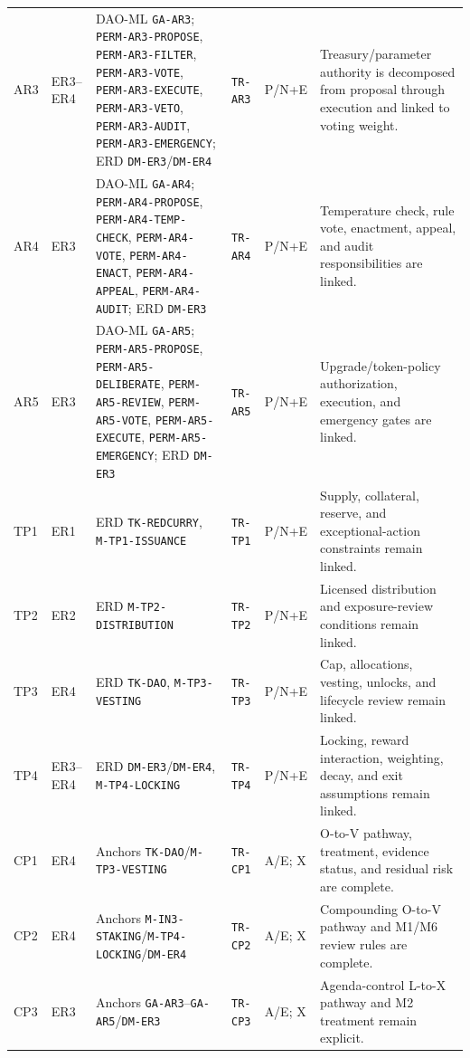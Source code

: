 \documentclass[10pt]{article}
\begin{document}
\begin{landscape}
{\begin{longtable}{@{}p{.035\linewidth}p{.07\linewidth}p{.245\linewidth}p{.105\linewidth}p{.09\linewidth}p{.31\linewidth}@{}}
AR3 & ER3--ER4 & DAO-ML \texttt{GA-AR3}; \texttt{PERM-AR3-PROPOSE}, \texttt{PERM-AR3-FILTER}, \texttt{PERM-AR3-VOTE}, \texttt{PERM-AR3-EXECUTE}, \texttt{PERM-AR3-VETO}, \texttt{PERM-AR3-AUDIT}, \texttt{PERM-AR3-EMERGENCY}; ERD \texttt{DM-ER3}/\texttt{DM-ER4} & \texttt{TR-AR3} & P/N+E & Treasury/parameter authority is decomposed from proposal through execution and linked to voting weight. \\
AR4 & ER3 & DAO-ML \texttt{GA-AR4}; \texttt{PERM-AR4-PROPOSE}, \texttt{PERM-AR4-TEMP-CHECK}, \texttt{PERM-AR4-VOTE}, \texttt{PERM-AR4-ENACT}, \texttt{PERM-AR4-APPEAL}, \texttt{PERM-AR4-AUDIT}; ERD \texttt{DM-ER3} & \texttt{TR-AR4} & P/N+E & Temperature check, rule vote, enactment, appeal, and audit responsibilities are linked. \\
AR5 & ER3 & DAO-ML \texttt{GA-AR5}; \texttt{PERM-AR5-PROPOSE}, \texttt{PERM-AR5-DELIBERATE}, \texttt{PERM-AR5-REVIEW}, \texttt{PERM-AR5-VOTE}, \texttt{PERM-AR5-EXECUTE}, \texttt{PERM-AR5-EMERGENCY}; ERD \texttt{DM-ER3} & \texttt{TR-AR5} & P/N+E & Upgrade/token-policy authorization, execution, and emergency gates are linked. \\
TP1 & ER1 & ERD \texttt{TK-REDCURRY}, \texttt{M-TP1-ISSUANCE} & \texttt{TR-TP1} & P/N+E & Supply, collateral, reserve, and exceptional-action constraints remain linked. \\
TP2 & ER2 & ERD \texttt{M-TP2-DISTRIBUTION} & \texttt{TR-TP2} & P/N+E & Licensed distribution and exposure-review conditions remain linked. \\
TP3 & ER4 & ERD \texttt{TK-DAO}, \texttt{M-TP3-VESTING} & \texttt{TR-TP3} & P/N+E & Cap, allocations, vesting, unlocks, and lifecycle review remain linked. \\
TP4 & ER3--ER4 & ERD \texttt{DM-ER3}/\texttt{DM-ER4}, \texttt{M-TP4-LOCKING} & \texttt{TR-TP4} & P/N+E & Locking, reward interaction, weighting, decay, and exit assumptions remain linked. \\
CP1 & ER4 & Anchors \texttt{TK-DAO}/\texttt{M-TP3-VESTING} & \texttt{TR-CP1} & A/E; X & O-to-V pathway, treatment, evidence status, and residual risk are complete. \\
CP2 & ER4 & Anchors \texttt{M-IN3-STAKING}/\texttt{M-TP4-LOCKING}/\texttt{DM-ER4} & \texttt{TR-CP2} & A/E; X & Compounding O-to-V pathway and M1/M6 review rules are complete. \\
CP3 & ER3 & Anchors \texttt{GA-AR3}--\texttt{GA-AR5}/\texttt{DM-ER3} & \texttt{TR-CP3} & A/E; X & Agenda-control L-to-X pathway and M2 treatment remain explicit. \\

\end{longtable}}
\end{landscape}
\end{document}
